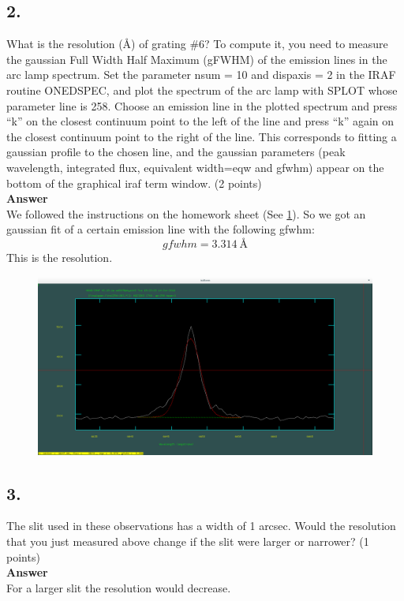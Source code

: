 \documentclass[11pt,a4paper,twoside]{article}
\begin{document}
\subsection*{2.}
What is the resolution (\AA) of grating \#6? To compute it, you need to measure the
gaussian Full Width Half Maximum (gFWHM) of the emission lines in the arc lamp
spectrum. Set the parameter nsum = 10 and dispaxis = 2 in the IRAF routine
ONEDSPEC, and plot the spectrum of the arc lamp with SPLOT whose parameter line is
258. Choose an emission line in the plotted spectrum and press “k” on the closest
continuum point to the left of the line and press “k” again on the closest continuum point to
the right of the line. This corresponds to fitting a gaussian profile to the chosen line, and
the gaussian parameters (peak wavelength, integrated flux, equivalent width=eqw and
gfwhm) appear on the bottom of the graphical iraf term window. (2 points)\\
\textbf{Answer}\\
We followed the instructions on the homework sheet (See \ref{fig:A2_gausssfit}). So we got an gaussian fit of a certain emission line with the following gfwhm:
\begin{equation*}
gfwhm=\SI{3.314}{\angstrom}
\end{equation*}
This is the resolution.
\begin{figure}[h]
\centering
\includegraphics[width=0.7\linewidth]{pic/A2_gausssfit}
\caption{}
\label{fig:A2_gausssfit}
\end{figure}

\subsection*{3.} The slit used in these observations has a width of 1 arcsec. Would the resolution that
you just measured above change if the slit were larger or narrower? (1 points)\\

\textbf{Answer}\\
For a larger slit the resolution would decrease. 
\end{document}
